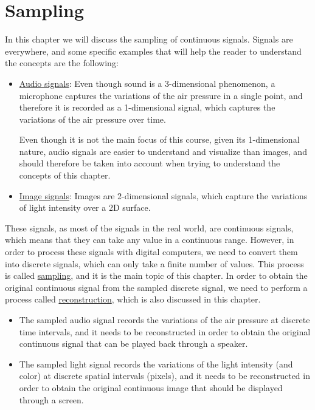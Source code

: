 \chapter{Sampling}

In this chapter we will discuss the sampling of continuous signals. Signals are everywhere, and some specific examples that will help the reader to understand the concepts are the following: 
\begin{itemize}
    \item \ul{Audio signals}: Even though sound is a 3-dimensional phenomenon, a microphone captures the variations of the air pressure in a single point, and therefore it is recorded as a 1-dimensional signal, which captures the variations of the air pressure over time.
    
    Even though it is not the main focus of this course, given its 1-dimensional nature, audio signals are easier to understand and visualize than images, and should therefore be taken into account when trying to understand the concepts of this chapter.
    \item \ul{Image signals}: Images are 2-dimensional signals, which capture the variations of light intensity over a 2D surface.
\end{itemize}

These signals, as most of the signals in the real world, are continuous signals, which means that they can take any value in a continuous range. However, in order to process these signals with digital computers, we need to convert them into discrete signals, which can only take a finite number of values. This process is called \ul{sampling}, and it is the main topic of this chapter. In order to obtain the original continuous signal from the sampled discrete signal, we need to perform a process called \ul{reconstruction}, which is also discussed in this chapter.
\begin{itemize}
    \item The sampled audio signal records the variations of the air pressure at discrete time intervals, and it needs to be reconstructed in order to obtain the original continuous signal that can be played back through a speaker.
    \item The sampled light signal records the variations of the light intensity (and color) at discrete spatial intervals (pixels), and it needs to be reconstructed in order to obtain the original continuous image that should be displayed through a screen.
\end{itemize}


